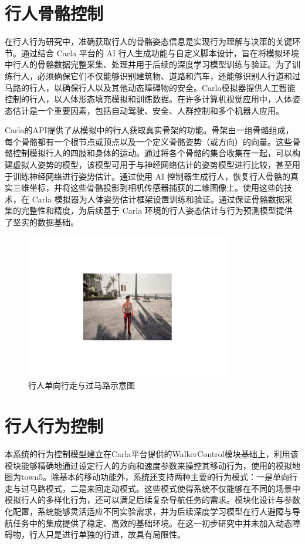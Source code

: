 \section{行人骨骼控制}
在行人行为研究中，准确获取行人的骨骼姿态信息是实现行为理解与决策的关键环节。通过结合 Carla 平台的 AI 行人生成功能与自定义脚本设计，旨在将模拟环境中行人的骨骼数据完整采集、处理并用于后续的深度学习模型训练与验证。为了训练行人，必须确保它们不仅能够识别建筑物、道路和汽车，还能够识别人行道和过马路的行人，以确保行人以及其他动态障碍物的安全。Carla模拟器提供人工智能控制的行人，以人体形态填充模拟和训练数据。在许多计算机视觉应用中，人体姿态估计是一个重要因素，包括自动驾驶、安全、人群控制和多个机器人应用。 

Carla的API提供了从模拟中的行人获取真实骨架的功能。骨架由一组骨骼组成，每个骨骼都有一个根节点或顶点以及一个定义骨骼姿势（或方向）的向量。这些骨骼控制模拟行人的四肢和身体的运动。通过将各个骨骼的集合收集在一起，可以构建虚拟人姿势的模型，该模型可用于与神经网络估计的姿势模型进行比较，甚至用于训练神经网络进行姿势估计。通过使用 AI 控制器生成行人，恢复行人骨骼的真实三维坐标，并将这些骨骼投影到相机传感器捕获的二维图像上。使用这些的技术，在 Carla 模拟器为人体姿势估计框架设置训练和验证。通过保证骨骼数据采集的完整性和精度，为后续基于 Carla 环境的行人姿态估计与行为预测模型提供了坚实的数据基础。

\begin{figure}[H]
    \centering
    \includegraphics[width=0.8\textwidth]{images/pedestrian_skeleton.pdf}
    \caption{行人单向行走与过马路示意图}
    \label{f.pedestrian_skeleton}
\end{figure}

\section{行人行为控制}
本系统的行为控制模型建立在Carla平台提供的WalkerControl模块基础上，利用该模块能够精确地通过设定行人的方向和速度参数来操控其移动行为，使用的模拟地图为town5。除基本的移动功能外，系统还支持两种主要的行为模式：一是单向行走与过马路模式，二是来回走动模式。这些模式使得系统不仅能够在不同的场景中模拟行人的多样化行为，还可以满足后续复杂导航任务的需求。模块化设计与参数化配置，系统能够灵活适应不同实验需求，并为后续深度学习模型在行人避障与导航任务中的集成提供了稳定、高效的基础环境。在这一初步研究中并未加入动态障碍物，行人只是进行单独的行进，故具有局限性。

